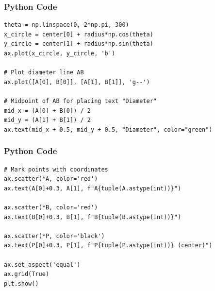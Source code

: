 \documentclass{beamer}
\begin{document}
\begin{frame}[fragile]
    \frametitle{Python Code}
    \begin{lstlisting}
theta = np.linspace(0, 2*np.pi, 300)
x_circle = center[0] + radius*np.cos(theta)
y_circle = center[1] + radius*np.sin(theta)
ax.plot(x_circle, y_circle, 'b')

# Plot diameter line AB
ax.plot([A[0], B[0]], [A[1], B[1]], 'g--')

# Midpoint of AB for placing text "Diameter"
mid_x = (A[0] + B[0]) / 2
mid_y = (A[1] + B[1]) / 2
ax.text(mid_x + 0.5, mid_y + 0.5, "Diameter", color="green")
\end{lstlisting}
\end{frame}


\begin{frame}[fragile]
    \frametitle{Python Code}
    \begin{lstlisting}
# Mark points with coordinates
ax.scatter(*A, color='red')
ax.text(A[0]+0.3, A[1], f"A{tuple(A.astype(int))}")

ax.scatter(*B, color='red')
ax.text(B[0]+0.3, B[1], f"B{tuple(B.astype(int))}")

ax.scatter(*P, color='black')
ax.text(P[0]+0.3, P[1], f"P{tuple(P.astype(int))} (center)")

ax.set_aspect('equal')
ax.grid(True)
plt.show()
\end{lstlisting}
\end{frame}
\end{document}
